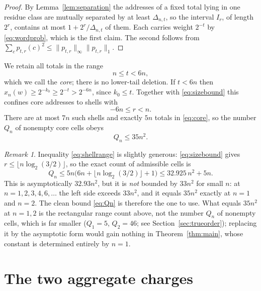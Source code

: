 \documentclass[11pt,reqno]{amsart}
\theoremstyle{plain}
\theoremstyle{definition}
\theoremstyle{remark}
\newtheorem{remark}[theorem]{Remark}
\begin{document}
\begin{proof}
By Lemma~\ref{lem:separation} the addresses of a fixed total lying in one
residue class are mutually separated by at least $\Delta_{n,t}$, so the
interval $I_r$, of length $2^r$, contains at most $1+2^r/\Delta_{n,t}$ of
them. Each carries weight $2^{-t}$ by \eqref{eq:wordprob}, which is the
first claim. The second follows from
$\sum_cp_{t,r}(c)^2\le\|p_{t,r}\|_\infty\|p_{t,r}\|_1$.
\end{proof}

We retain all totals in the range
\begin{equation}
n\le t<6n,
\label{eq:core}
\end{equation}
which we call the \emph{core}; there is no lower-tail deletion. If $t<6n$
then $x_n(w)\ge2^{-k_0}\ge2^{-t}>2^{-6n}$, since $k_0\le t$. Together with
\eqref{eq:sizebound} this confines core addresses to shells with
\begin{equation}
-6n\le r<n .
\label{eq:shellrange}
\end{equation}
There are at most $7n$ such shells and exactly $5n$ totals in
\eqref{eq:core}, so the number $Q_n$ of nonempty core cells obeys
\begin{equation}
Q_n\le35n^2 .
\label{eq:Qn}
\end{equation}

\begin{remark}\label{rem:Qsharp}
Inequality \eqref{eq:shellrange} is slightly generous: \eqref{eq:sizebound}
gives $r\le\lfloor n\log_2(3/2)\rfloor$, so the exact count of admissible
cells is
\[
Q_n\le5n\bigl(6n+\lfloor n\log_2(3/2)\rfloor+1\bigr)
\le 32.925\,n^2+5n .
\]
This is asymptotically $32.93n^2$, but it is \emph{not} bounded by $33n^2$
for small $n$: at $n=1,2,3,4,6,\dots$ the left side exceeds $33n^2$, and it
equals $35n^2$ exactly at $n=1$ and $n=2$. The clean bound
\eqref{eq:Qn} is therefore the one to use. What equals $35n^2$ at $n=1,2$
is the rectangular range count above, not the number $Q_n$ of nonempty
cells, which is far smaller ($Q_1=5$, $Q_2=46$; see
Section~\ref{sec:trueorder});
replacing it by the asymptotic form would gain nothing in
Theorem~\ref{thm:main}, whose constant is determined entirely by $n=1$.
\end{remark}

\section{The two aggregate charges}\label{sec:charges}
\end{document}
